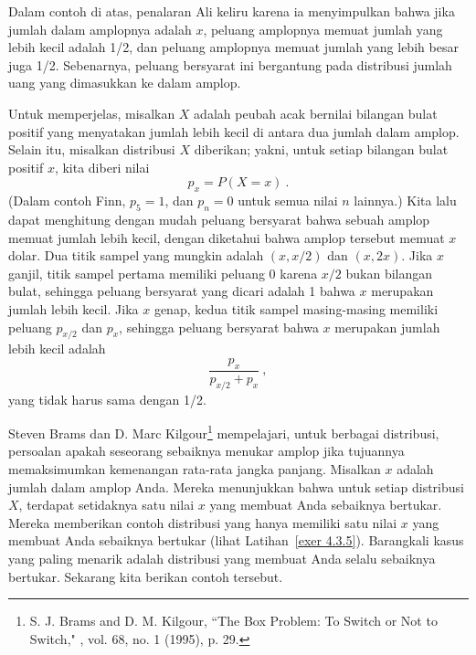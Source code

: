 Dalam contoh di atas, penalaran Ali keliru karena ia menyimpulkan bahwa jika jumlah
dalam amplopnya adalah $x$, peluang amplopnya memuat jumlah yang lebih kecil adalah
1/2, dan peluang amplopnya memuat jumlah yang lebih besar juga 1/2.  Sebenarnya,
peluang bersyarat ini bergantung pada distribusi jumlah uang yang dimasukkan ke dalam
amplop.
\par
Untuk memperjelas, misalkan $X$ adalah peubah acak bernilai bilangan bulat positif
yang menyatakan jumlah lebih kecil di antara dua jumlah dalam amplop.  Selain itu,
misalkan distribusi $X$ diberikan; yakni, untuk setiap bilangan bulat positif $x$,
kita diberi nilai
$$p_x = P(X = x)\ .$$
(Dalam contoh Finn, $p_5 = 1$, dan $p_{n} = 0$ untuk semua nilai $n$ lainnya.)
Kita lalu dapat menghitung dengan mudah peluang bersyarat bahwa sebuah amplop memuat
jumlah lebih kecil, dengan diketahui bahwa amplop tersebut memuat $x$ dolar.  Dua
titik sampel yang mungkin adalah $(x, x/2)$ dan $(x, 2x)$.  Jika $x$ ganjil, titik
sampel pertama memiliki peluang 0 karena $x/2$ bukan bilangan bulat, sehingga peluang
bersyarat yang dicari adalah 1 bahwa $x$ merupakan jumlah lebih kecil.  Jika $x$
genap, kedua titik sampel masing-masing memiliki peluang $p_{x/2}$ dan $p_x$, sehingga
peluang bersyarat bahwa $x$ merupakan jumlah lebih kecil adalah
$$\frac{p_x}{p_{x/2} + p_x}\ ,$$
yang tidak harus sama dengan 1/2.
\par
Steven Brams dan D. Marc Kilgour\footnote{S. J. Brams
and D. M. Kilgour, ``The Box Problem:  To Switch or Not to Switch," ,
vol. 68, no. 1 (1995),  p. 29.} mempelajari, untuk berbagai distribusi, persoalan
apakah seseorang sebaiknya menukar amplop jika tujuannya memaksimumkan kemenangan
rata-rata jangka panjang.  Misalkan $x$ adalah jumlah dalam amplop Anda.  Mereka
menunjukkan bahwa untuk setiap distribusi $X$, terdapat setidaknya satu nilai $x$ yang
membuat Anda sebaiknya bertukar.  Mereka memberikan contoh distribusi yang hanya
memiliki satu nilai $x$ yang membuat Anda sebaiknya bertukar (lihat
Latihan~\ref{exer 4.3.5}).  Barangkali kasus yang paling menarik adalah distribusi
yang membuat Anda selalu sebaiknya bertukar.  Sekarang kita berikan contoh tersebut.


